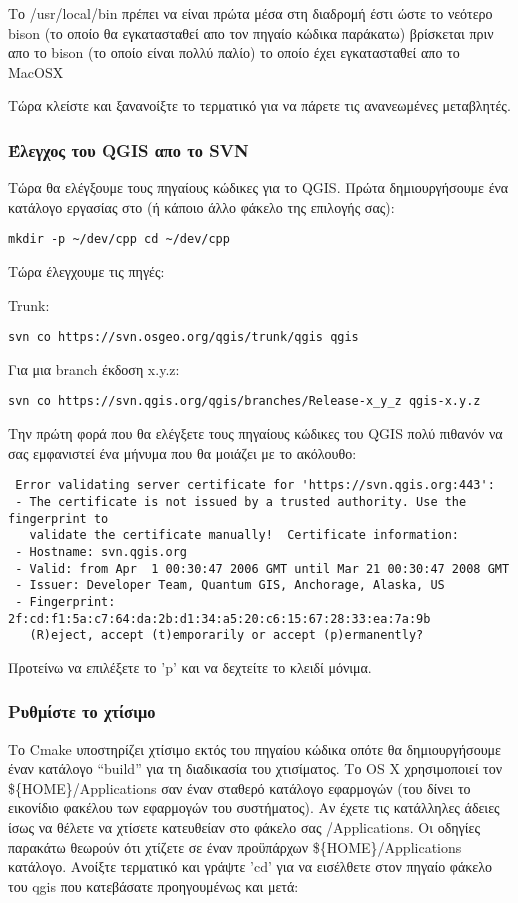 Το /usr/local/bin πρέπει να είναι πρώτα μέσα στη διαδρομή έστι ώστε το νεότερο bison (το οποίο θα εγκατασταθεί απο τον πηγαίο κώδικα παράκατω) βρίσκεται πριν απο το bison (το οποίο είναι πολλύ παλίο) το οποίο έχει εγκατασταθεί απο το MacOSX

Τώρα κλείστε και ξανανοίξτε το τερματικό για να πάρετε τις ανανεωμένες μεταβλητές.

\hypertarget{toc23}{}
\subsubsection{Έλεγχος του QGIS απο το SVN}
Τώρα θα ελέγξουμε τους πηγαίους κώδικες για το QGIS. Πρώτα δημιουργήσουμε ένα κατάλογο εργασίας στο (ή κάποιο άλλο φάκελο της επιλογής σας):

\begin{verbatim}
mkdir -p ~/dev/cpp cd ~/dev/cpp 
\end{verbatim}

Τώρα έλεγχουμε τις πηγές:

Trunk:

\begin{verbatim}
svn co https://svn.osgeo.org/qgis/trunk/qgis qgis 
\end{verbatim}

Για μια branch έκδοση x.y.z:

\begin{verbatim}
svn co https://svn.qgis.org/qgis/branches/Release-x_y_z qgis-x.y.z
\end{verbatim}

Την πρώτη φορά που θα ελέγξετε τους πηγαίους κώδικες του QGIS πολύ πιθανόν να σας εμφανιστεί ένα μήνυμα που θα μοιάζει με το ακόλουθο:

\begin{verbatim}
 Error validating server certificate for 'https://svn.qgis.org:443':
 - The certificate is not issued by a trusted authority. Use the fingerprint to
   validate the certificate manually!  Certificate information:
 - Hostname: svn.qgis.org
 - Valid: from Apr  1 00:30:47 2006 GMT until Mar 21 00:30:47 2008 GMT
 - Issuer: Developer Team, Quantum GIS, Anchorage, Alaska, US
 - Fingerprint: 2f:cd:f1:5a:c7:64:da:2b:d1:34:a5:20:c6:15:67:28:33:ea:7a:9b
   (R)eject, accept (t)emporarily or accept (p)ermanently?  
\end{verbatim}

Προτείνω να επιλέξετε το 'p' και να δεχτείτε το κλειδί μόνιμα.

\hypertarget{toc24}{}
\subsubsection{Ρυθμίστε το χτίσιμο}
Το Cmake υποστηρίζει χτίσιμο εκτός του πηγαίου κώδικα οπότε θα δημιουργήσουμε έναν κατάλογο “build” για τη διαδικασία του χτισίματος. Το OS X χρησιμοποιεί τον \$\{HOME\}/Applications σαν έναν σταθερό κατάλογο εφαρμογών (του δίνει το εικονίδιο φακέλου των εφαρμογών του συστήματος). Αν έχετε τις κατάλληλες άδειες ίσως να θέλετε να χτίσετε κατευθείαν στο φάκελο σας /Applications. Οι οδηγίες παρακάτω θεωρούν ότι χτίζετε σε έναν προϋπάρχων \$\{HOME\}/Applications κατάλογο.
Ανοίξτε τερματικό και γράψτε 'cd' για να εισέλθετε στον πηγαίο φάκελο του qgis που κατεβάσατε προηγουμένως και μετά:

